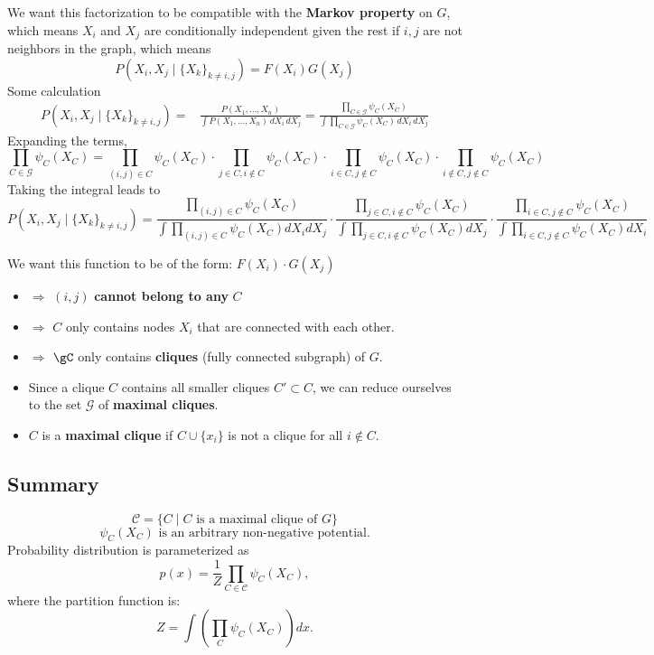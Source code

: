 \documentclass{article}%
\begin{document}
We want this factorization to be compatible with the \textbf{Markov property} on \( G \), which means \( X_i \) and \( X_j \) are conditionally independent given the rest if \( i, j \) are not neighbors in the graph, which means
\[
    P \left( X_i, X_j \mid \{X_k\}_{k \neq i,j} \right) = F(X_i) G(X_j)
\]
Some calculation
\begin{align*}
P \left( X_i, X_j \mid \{X_k\}_{k \neq i,j} \right) =&\frac{P(X_1, \dots, X_n)}{\int P(X_1, \dots, X_n) \, dX_i \, dX_j}=\frac{\prod_{C \in \mathcal{G}} \psi_C (X_C)}
{\int \prod_{C \in \mathcal{G}} \psi_C (X_C) \, dX_i \, dX_j}
\end{align*}
Expanding the terms,
\[\prod_{C \in \mathcal{G}} \psi_C (X_C)=
\prod_{(i,j) \in C} \psi_C (X_C) \cdot 
\prod_{j \in C, i \notin C} \psi_C (X_C) \cdot 
\prod_{i \in C, j \notin C} \psi_C (X_C) \cdot
\prod_{i \notin C, j \notin C} \psi_C (X_C)
\]
Taking the integral leads to 
\[
P \left( X_i, X_j \mid \{X_k\}_{k \neq i,j} \right)=\frac{\prod_{(i,j) \in C} \psi_C (X_C)}{\int \prod_{(i,j) \in C} \psi_C (X_C) dX_i dX_j}\cdot\frac{\prod_{j \in C, i \notin C} \psi_C (X_C)}{\int \prod_{j \in C, i \notin C} \psi_C (X_C)dX_j} \cdot\frac{\prod_{i \in C, j \notin C} \psi_C (X_C)}{\int\prod_{i \in C, j \notin C} \psi_C (X_C) dX_i} 
\]

We want this function to be of the form:
\(
F(X_i) \cdot G(X_j)
\)

\begin{itemize}

\item $\Rightarrow$ \( (i,j) \) \textbf{cannot belong to any} \( C \)

\item $\Rightarrow$ $C$ only contains nodes $X_i$ that are connected with each other.

\item $\Rightarrow$ $\gC$ only contains \textbf{cliques} (fully connected subgraph) of \( G \).

    \item Since a clique \( C \) contains all smaller cliques \( C' \subset C \), we can reduce ourselves to the set \( \mathcal{G} \) of \textbf{maximal cliques}.
    \item \( C \) is a \textbf{maximal clique} if \( C \cup \{ x_i \} \) is not a clique for all \( i \notin C \).
\end{itemize}

\subsection{Summary}
\[
\mathcal{C} = \{ C \mid C \text{ is a maximal clique of } G \}
\]
\[
\psi_C(X_C) \text{ is an arbitrary non-negative potential.}
\]
Probability distribution is parameterized as 
\[
p(x) = \frac{1}{Z} \prod_{C \in \mathcal{C}} \psi_C (X_C),
\]
where the partition function is:
\[
Z = \int \left( \prod_C \psi_C (X_C) \right) dx.
\]
\end{document}
